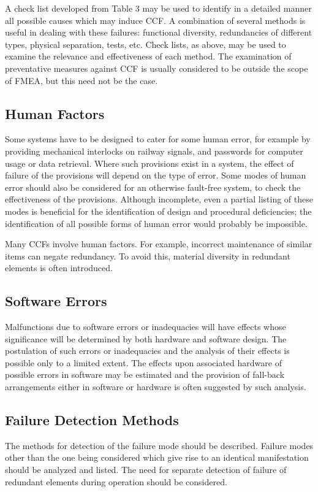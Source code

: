 \documentclass[./dissertation.tex]{subfiles}
\begin{document}
A check list developed from Table 3 may be used to identify in a detailed manner all possible causes which may induce CCF. A combination of several methods is useful in dealing with these failures: functional diversity, redundancies of different types, physical separation, tests, etc. Check lists, as above, may be used to examine the relevance and effectiveness of each method. The examination of preventative measures against CCF is usually considered to be outside the scope of FMEA, but this need not be the case.

\subsection{Human Factors}
Some systems have to be designed to cater for some human error, for example by providing mechanical interlocks on railway signals, and passwords for computer usage or data retrieval. Where such provisions exist in a system, the effect of failure of the provisions will depend on the type of error. Some modes of human error should also be considered for an otherwise fault-free system, to check the effectiveness of the provisions. Although incomplete, even a partial listing of these modes is beneficial for the identification of design and procedural deficiencies; the identification of all possible forms of human error would probably be impossible.

Many CCFs involve human factors. For example, incorrect maintenance of similar items can negate redundancy. To avoid this, material diversity in redundant elements is often introduced.

\subsection{Software Errors}
Malfunctions due to software errors or inadequacies will have effects whose significance will be determined by both hardware and software design. The postulation of such errors or inadequacies and the analysis of their effects is possible only to a limited extent. The effects upon associated hardware of possible errors in software may be estimated and the provision of fall-back arrangements either in software or hardware is often suggested by such analysis.

\subsection{Failure Detection Methods}
The methods for detection of the failure mode should be described. Failure modes other than the one being considered which give rise to an identical manifestation should be analyzed and listed. The need for separate detection of failure of redundant elements during operation should be considered.
\end{document}

